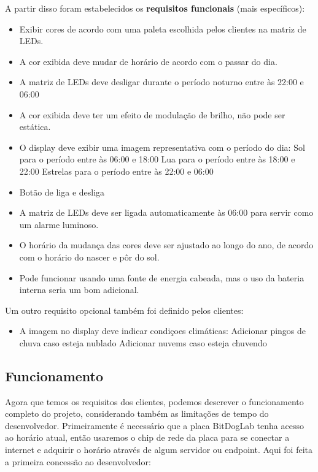 \documentclass[12pt]{article}
\begin{document}
A partir disso foram estabelecidos os \textbf{requisitos funcionais} (mais específicos):

\begin{itemize}
    \item Exibir cores de acordo com uma paleta escolhida pelos clientes na matriz de LEDs.
    \item A cor exibida deve mudar de horário de acordo com o passar do dia.
    \item A matriz de LEDs deve desligar durante o período noturno entre às 22:00 e 06:00 
    \item A cor exibida deve ter um efeito de modulação de brilho, não pode ser estática.
    \item O display deve exibir uma imagem representativa com o período do dia:
        \subitem Sol para o período entre às 06:00 e 18:00
        \subitem Lua para o período entre às 18:00 e 22:00
        \subitem Estrelas para o período entre às 22:00 e 06:00
    \item Botão de liga e desliga
    \item A matriz de LEDs deve ser ligada automaticamente às 06:00 para servir como um alarme luminoso.
    \item O horário da mudança das cores deve ser ajustado ao longo do ano, de acordo com o horário do nascer e pôr do sol.
    \item Pode funcionar usando uma fonte de energia cabeada, mas o uso da bateria interna seria um bom adicional. 
\end{itemize}

Um outro requisito opcional também foi definido pelos clientes:
\begin{itemize}
    \item A imagem no display deve indicar condiçoes climáticas:
    \subitem Adicionar pingos de chuva caso esteja nublado
    \subitem Adicionar nuvems caso esteja chuvendo
\end{itemize}

\subsection{Funcionamento}
Agora que temos os requisitos dos clientes, podemos descrever o funcionamento completo do projeto, considerando também as limitações de tempo do desenvolvedor.
Primeiramente é necessário que a placa BitDogLab tenha acesso ao horário atual, então usaremos o chip de rede da placa para se conectar a internet e adquirir o horário através de algum servidor ou endpoint. Aqui foi feita a primeira concessão ao desenvolvedor:
\end{document}
